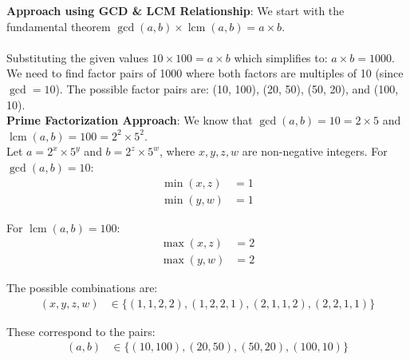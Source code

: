 \documentclass[12pt]{article}
\begin{document}
\textbf{Approach using GCD \& LCM Relationship}: We start with the fundamental theorem $\gcd(a, b) \times \operatorname{lcm}(a, b) = a \times b$. \\ \\
Substituting the given values $10 \times 100 = a \times b$ which simplifies to: $a \times b = 1000$.
We need to find factor pairs of 1000 where both factors are multiples of 10 (since $\gcd = 10$).
The possible factor pairs are: (10, 100), (20, 50), (50, 20), and (100, 10). \\

\textbf{Prime Factorization Approach}: We know that $\gcd(a, b) = 10 = 2 \times 5$ and $\operatorname{lcm}(a, b) = 100 = 2^2 \times 5^2$. \\

Let $a = 2^x \times 5^y$ and $b = 2^z \times 5^w$, where $x, y, z, w$ are non-negative integers.
For $\gcd(a, b) = 10$:
\begin{align*}
    \min(x, z) &= 1 \\
    \min(y, w) &= 1
\end{align*}

For $\operatorname{lcm}(a, b) = 100$:
\begin{align*}
    \max(x, z) &= 2 \\
    \max(y, w) &= 2
\end{align*}

The possible combinations are:
\begin{align*}
    (x, y, z, w) &\in \{(1, 1, 2, 2), (1, 2, 2, 1), (2, 1, 1, 2), (2, 2, 1, 1)\}
\end{align*}

These correspond to the pairs:
\begin{align*}
    (a, b) &\in \{(10, 100), (20, 50), (50, 20), (100, 10)\}
\end{align*}
\end{document}
